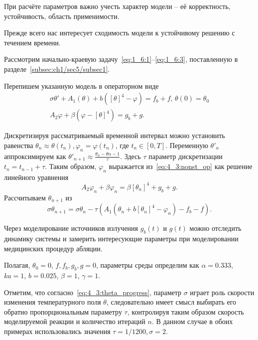 При расчёте параметров важно учесть характер модели -- её корректность, устойчивость,
область применимости.

Прежде всего нас интересует сходимость модели к устойчивому решению с течением времени.

Рассмотрим начально-краевую задачу~\eqref{eq:1_6:1}--\eqref{eq:1_6:3},
поставленную в разделе~\ref{subsec:ch1/sec5/subsec1}.

Перепишем указанную модель в операторном виде
\begin{equation}
    \label{eq:4_3:nonst_op}
    \begin{gathered}
        \sigma \theta' + A_1(\theta) + b([\theta]^4 - \varphi) = f_b + f, \, \theta(0) = \theta_0 \\
        A_2\varphi + \beta(\varphi - [\theta]^4) = g_b + g.
    \end{gathered}
\end{equation}

Дискретизируя рассматриваемый временной интервал можно установить равенства
$\theta_n \approx \theta(t_n), \varphi_n = \varphi(t_n)$, где $t_n \in [0, T]$.
Переменную $\theta'_n$ аппроксимируем как $\theta'_{n+1} \approx \frac{\theta_{n} - \theta{n-1}}{\tau}$.
Здесь $\tau$ параметр дискретизации $t_n = t_{n-1} + \tau$.
Таким образом, $\varphi_n$ выражается из~\eqref{eq:4_3:nonst_op} как решение линейного уравнения
\[
    A_2 \varphi_n + \beta \varphi_n = \beta [\theta_n]^4 + g_b + g.
\]
Рассчитываем $\theta_{n+1}$ из
\begin{equation}
    \label{eq:4_3:theta_progress}
    \sigma \theta_{n+1} = \sigma \theta_n - \tau (A_1(\theta_n + b[\theta_n]^4 - \varphi_n) - f_b -f).
\end{equation}

Через моделирование источников излучения $g_b(t)$ и $g(t)$ можно отследить динамику системы и замерить
интересующие параметры при моделировании медицинских процедур абляции.

Полагая, $\theta_0 = 0$, $f, f_b, g_b, g = 0$, параметры среды определим как
$\alpha = 0.333$,
$ka = 1$,
$b = 0.025$,
$\beta = 1$,
$\gamma = 1$.

Отметим, что согласно~\eqref{eq:4_3:theta_progress},
параметр $\sigma$ играет роль скорости изменения температурного поля $\theta$, следовательно
имеет смысл выбирать его обратно пропорциональным параметру $\tau$,
контролируя таким образом скорость моделируемой реакции и количество итераций $n$.
В данном случае в обоих примерах использовались значения $\tau = 1/1200, \sigma = 2$.

